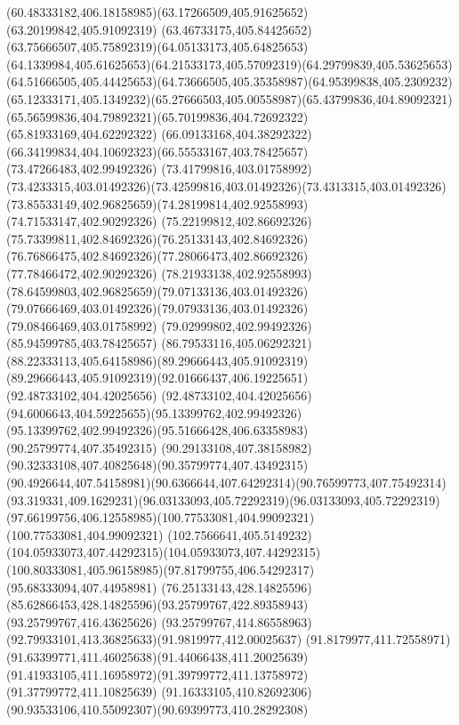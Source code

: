 {{	\curveto(60.48333182,406.18158985)(63.17266509,405.91625652)(63.20199842,405.91092319)
	\curveto(63.46733175,405.84425652)(63.75666507,405.75892319)(64.05133173,405.64825653)
	\curveto(64.1339984,405.61625653)(64.21533173,405.57092319)(64.29799839,405.53625653)
	\curveto(64.51666505,405.44425653)(64.73666505,405.35358987)(64.95399838,405.2309232)
	\curveto(65.12333171,405.1349232)(65.27666503,405.00558987)(65.43799836,404.89092321)
	\curveto(65.56599836,404.79892321)(65.70199836,404.72692322)(65.81933169,404.62292322)
	\curveto(66.09133168,404.38292322)(66.34199834,404.10692323)(66.55533167,403.78425657)
	\lineto(73.47266483,402.99492326)
	\lineto(73.41799816,403.01758992)
	\curveto(73.4233315,403.01492326)(73.42599816,403.01492326)(73.4313315,403.01492326)
	\curveto(73.85533149,402.96825659)(74.28199814,402.92558993)(74.71533147,402.90292326)
	\curveto(75.22199812,402.86692326)(75.73399811,402.84692326)(76.25133143,402.84692326)
	\curveto(76.76866475,402.84692326)(77.28066473,402.86692326)(77.78466472,402.90292326)
	\curveto(78.21933138,402.92558993)(78.64599803,402.96825659)(79.07133136,403.01492326)
	\curveto(79.07666469,403.01492326)(79.07933136,403.01492326)(79.08466469,403.01758992)
	\lineto(79.02999802,402.99492326)
	\lineto(85.94599785,403.78425657)
	\curveto(86.79533116,405.06292321)(88.22333113,405.64158986)(89.29666443,405.91092319)
	\curveto(89.29666443,405.91092319)(92.01666437,406.19225651)(92.48733102,404.42025656)
	\curveto(92.48733102,404.42025656)(94.6006643,404.59225655)(95.13399762,402.99492326)
	\curveto(95.13399762,402.99492326)(95.51666428,406.63358983)(90.25799774,407.35492315)
	\curveto(90.29133108,407.38158982)(90.32333108,407.40825648)(90.35799774,407.43492315)
	\curveto(90.4926644,407.54158981)(90.6366644,407.64292314)(90.76599773,407.75492314)
	\curveto(93.319331,409.1629231)(96.03133093,405.72292319)(96.03133093,405.72292319)
	\curveto(97.66199756,406.12558985)(100.77533081,404.99092321)(100.77533081,404.99092321)
	\curveto(102.7566641,405.5149232)(104.05933073,407.44292315)(104.05933073,407.44292315)
	\curveto(100.80333081,405.96158985)(97.81799755,406.54292317)(95.68333094,407.44958981)
	\moveto(76.25133143,428.14825596)
	\curveto(85.62866453,428.14825596)(93.25799767,422.89358943)(93.25799767,416.43625626)
	\curveto(93.25799767,414.86558963)(92.79933101,413.36825633)(91.9819977,412.00025637)
	\curveto(91.8179977,411.72558971)(91.63399771,411.46025638)(91.44066438,411.20025639)
	\curveto(91.41933105,411.16958972)(91.39799772,411.13758972)(91.37799772,411.10825639)
	\curveto(91.16333105,410.82692306)(90.93533106,410.55092307)(90.69399773,410.28292308)
}}
